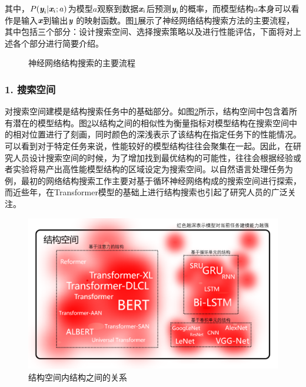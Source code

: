 \noindent 其中，${P}(\textbf{\em y}_{i}|\textbf{\em x}_{i};a)$为模型$a$观察到数据$\textbf{\em x}_{i}$后预测$\textbf{\em y}_{i}$的概率，而模型结构$a$本身可以看作是输入$\textbf{\em x}$到输出$\textbf{\em y}$ 的映射函数。图\ref{fig:15-29}展示了神经网络结构搜索方法的主要流程，其中包括三个部分：设计搜索空间、选择搜索策略以及进行性能评估，下面将对上述各个部分进行简要介绍。

\begin{figure}[htp]
\centering

\caption{神经网络结构搜索的主要流程}
\label{fig:15-29}
\end{figure}


\subsubsection{1. 搜索空间}

\parinterval 对搜索空间建模是结构搜索任务中的基础部分。如图\ref{fig:15-30}所示，结构空间中包含着所有潜在的模型结构。图\ref{fig:15-30}以结构之间的相似性为衡量指标对模型结构在搜索空间中的相对位置进行了刻画，同时颜色的深浅表示了该结构在指定任务下的性能情况。可以看到对于特定任务来说，性能较好的模型结构往往会聚集在一起。因此，在研究人员设计搜索空间的时候，为了增加找到最优结构的可能性，往往会根据经验或者实验将易产出高性能模型结构的区域设定为搜索空间。以自然语言处理任务为例，最初的网络结构搜索工作主要对基于循环神经网络构成的搜索空间进行探索，而近些年，在Transformer模型的基础上进行结构搜索也引起了研究人员的广泛关注。

\begin{figure}[htp]
\centering
\includegraphics[scale=0.5]{./Chapter15/Figures/figure-relationship-between-structures-in-structural-space.jpg}
\caption{结构空间内结构之间的关系}
\label{fig:15-30}
\end{figure}

